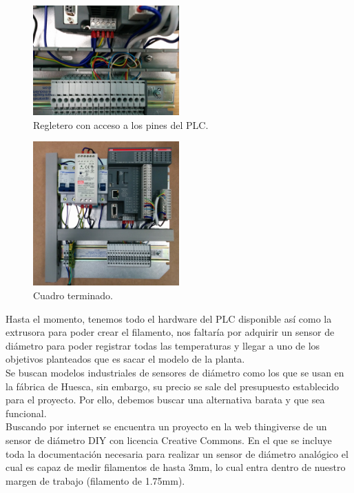     \begin{figure}[H]
            \centering
            \includegraphics[width=0.5\textwidth]{images/cuadro/IMG_20150331_113607.jpg}
            \caption{Regletero con acceso a los pines del PLC.}
            \label{fig:cuad_montaje6}
    \end{figure}
    \begin{figure}[H]
            \centering
            \includegraphics[width=0.5\textwidth]{images/cuadro/IMG_20150331_114950.jpg}
            \caption{Cuadro terminado.}
            \label{fig:cuad_montaje7}
    \end{figure}

Hasta el momento, tenemos todo el hardware del PLC disponible así como la extrusora para poder crear el filamento, nos faltaría por adquirir un sensor de diámetro para poder registrar todas las temperaturas y llegar a uno de los objetivos planteados que es sacar el modelo de la planta.\\

Se buscan modelos industriales de sensores de diámetro como los que se usan en la fábrica de Huesca, sin embargo, su precio se sale del presupuesto establecido para el proyecto. Por ello, debemos buscar una alternativa barata y que sea funcional.\\

Buscando por internet se encuentra un proyecto en la web thingiverse \cite{thing_filamento} de un sensor de diámetro DIY con licencia Creative Commons. En el que se incluye toda la documentación necesaria para realizar un sensor de diámetro analógico el cual es capaz de medir filamentos de hasta 3mm, lo cual entra dentro de nuestro margen de trabajo (filamento de 1.75mm).\\


